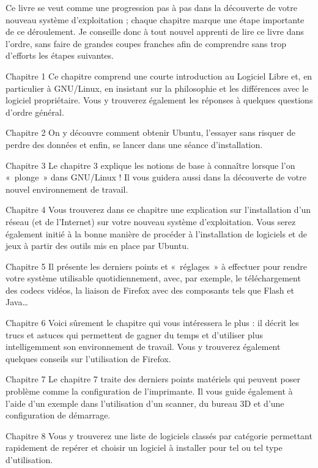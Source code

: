 Ce livre se veut comme une progression pas à pas dans la découverte de votre nouveau système d'exploitation ; chaque chapitre marque une étape importante de ce déroulement. Je conseille donc à tout nouvel apprenti de lire ce livre dans l'ordre, sans faire de grandes coupes franches afin de comprendre sans trop d'efforts les étapes suivantes.\par
\begin{DescriptionChapitres}
\item [Chapitre 1] Ce chapitre comprend une courte introduction au Logiciel Libre et, en particulier à GNU/Linux, en insistant sur la philosophie et les différences avec le logiciel propriétaire. Vous y trouverez également les réponses à quelques questions d'ordre général.
\item [Chapitre 2] On y découvre comment obtenir Ubuntu, l'essayer sans risquer de perdre des données et enfin, se lancer dans une séance d'installation.
\item [Chapitre 3] Le chapitre 3 explique les notions de base à connaître lorsque l'on «~plonge~» dans GNU/Linux ! Il vous guidera aussi dans la découverte de votre nouvel environnement de travail.
\item [Chapitre 4] Vous trouverez dans ce chapitre une explication sur l'installation d'un réseau (et de l'Internet) sur votre nouveau système d'exploitation. Vous serez également initié à la bonne manière de procéder à l'installation de logiciels et de jeux à partir des outils mis en place par Ubuntu.
\item [Chapitre 5] Il présente les derniers points et «~réglages~» à effectuer pour rendre votre système utilisable quotidiennement, avec, par exemple, le téléchargement des codecs vidéos, la liaison de Firefox avec des composants tels que Flash et Java\ldots{}
\item [Chapitre 6] Voici sûrement le chapitre qui vous intéressera le plus : il décrit les trucs et astuces qui permettent de gagner du temps et d'utiliser plus intelligemment son environnement de travail. Vous y trouverez également quelques conseils sur l'utilisation de Firefox.
\item [Chapitre 7] Le chapitre 7 traite des derniers points matériels qui peuvent poser problème comme la configuration de l'imprimante. Il vous guide également à l'aide d'un exemple dans l'utilisation d'un scanner, du bureau 3D et d'une configuration de démarrage.
\item [Chapitre 8] Vous y trouverez une liste de logiciels classés par catégorie permettant rapidement de repérer et choisir un logiciel à installer pour tel ou tel type d'utilisation.

\end{DescriptionChapitres}
